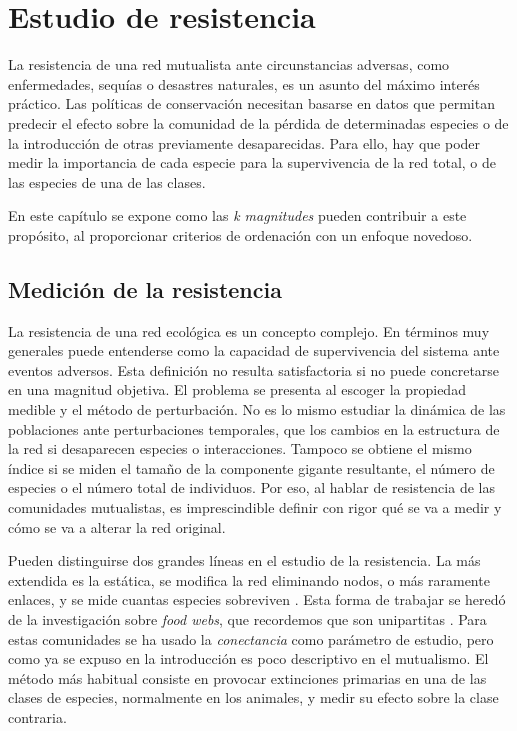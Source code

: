 
\chapter{Estudio de resistencia} %
\label{ChapterDESTRUCCION}  %

La resistencia de una red mutualista ante circunstancias adversas, como enfermedades, sequías o desastres naturales, es un asunto del máximo interés práctico. Las políticas de conservación necesitan basarse en datos que permitan predecir el efecto sobre la comunidad de la pérdida de determinadas especies o de la introducción de otras previamente desaparecidas. Para ello, hay que poder medir la importancia de cada especie para la supervivencia de la red total, o de las especies de una de las clases.

En este capítulo se expone como las \textit{k magnitudes} pueden contribuir a este propósito, al proporcionar criterios de ordenación con un enfoque novedoso.


\section{Medición de la resistencia}

La resistencia de una red ecológica es un concepto complejo. En términos muy generales puede entenderse como la capacidad de supervivencia del sistema ante eventos adversos. Esta definición no resulta satisfactoria si no puede concretarse en una magnitud objetiva. El problema se presenta al escoger la propiedad medible y el método de perturbación. No es lo mismo estudiar la dinámica de las poblaciones ante perturbaciones temporales, que los cambios en la estructura de la red si desaparecen especies o interacciones. Tampoco se obtiene el mismo índice si se miden el tamaño de la componente gigante resultante, el número de especies o el número total de individuos. Por eso, al hablar de resistencia de las comunidades mutualistas, es imprescindible definir con rigor qué se va a medir y cómo se va a alterar la red original.

Pueden distinguirse dos grandes líneas en el estudio de la resistencia. La más extendida es la estática, se modifica la red eliminando nodos, o más raramente enlaces, y se mide cuantas especies sobreviven \cite{memmott2004tolerance, ebenman2005using, kaiser2010robustness}. Esta forma de trabajar se heredó de la investigación sobre \textit{food webs}, que recordemos que son unipartitas \cite{dunne2002biodiversity, dunne2009cascading}. Para estas comunidades se ha usado la \textit{conectancia} como parámetro de estudio, pero como ya se expuso en la introducción es poco descriptivo en el mutualismo.
El método más habitual consiste en provocar extinciones primarias en una de las clases de especies, normalmente en los animales, y medir su efecto sobre la clase contraria.

